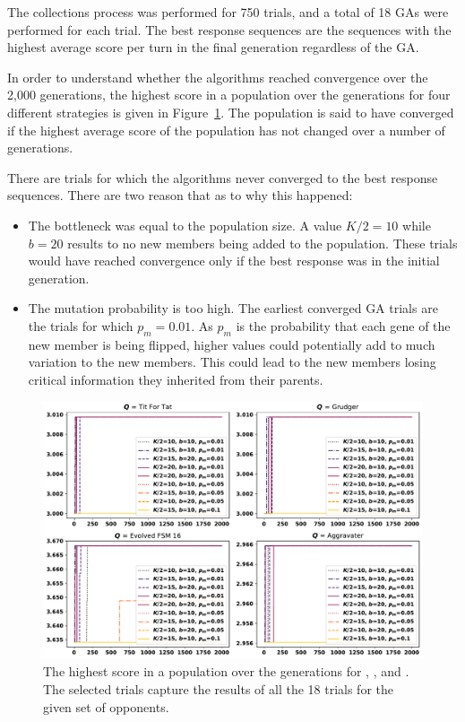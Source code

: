 The collections process was performed for 750 trials, and a total of 18 GAs were
performed for each trial. The best response sequences are the sequences with the
highest average score per turn in the final generation regardless of the GA.

In order to understand whether the algorithms reached convergence over the
2,000 generations, the highest score in a population over the generations for four
different strategies is given in Figure~\ref{fig:ga_trials}. The population is
said to have converged if the highest average score of
the population has not changed over a number of generations.

There are trials for which the algorithms never converged to the best response
sequences. There are two reason that as to why this happened:

\begin{itemize}
    \item The bottleneck was equal to the population size. A value $K/2=10$ while
    $b=20$ results to no new members being added to the population. These trials
    would have reached convergence only if the best response was in the initial
    generation.
    \item The mutation probability is too high. The earliest converged GA trials
    are the trials for which \(p_m=0.01\). As \(p_m\) is the probability that
    each gene of the new member is being flipped, higher values could potentially
    add to much variation to the new members. This could lead to the new members
    losing critical information they inherited from their parents.
\end{itemize}

\begin{figure}[!htbp]
    \centering
    \includegraphics[width=.9\textwidth]{src/chapters/06/img/gas_results_per_trial.pdf}
    \caption{The highest score in a population over the generations for \TitForTat,
    \Grudger, \FSMSixTeen and \Aggravater. The selected trials capture the results
    of all the 18 trials for the given set of opponents.}\label{fig:ga_trials}
\end{figure}

